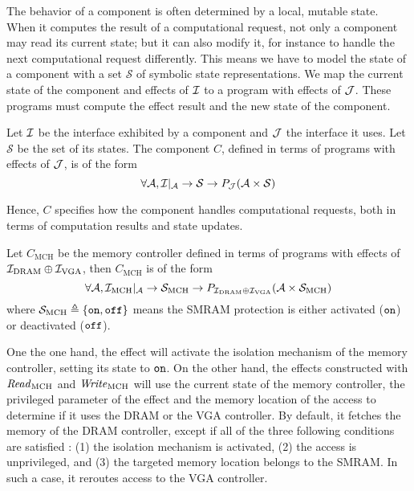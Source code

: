 The behavior of a component is often determined by a local, mutable state.
%
When it computes the result of a computational request, not only a component may
read its current state; but it can also modify it, for instance to handle the
next computational request differently.
%
This means we have to model the state of a component with a set $\mathcal{S}$ of
symbolic state representations.
%
We map the current state of the component and effects of $\mathcal{I}$ to a program with
effects of $\mathcal{J}$.
%
These programs must compute the effect result and the new state of the
component.

\begin{definition}[Component] \label{def:freespec:component-model} Let $\mathcal{I}$ be
  the interface exhibited by a component and $\mathcal{J}$ the interface it uses.
  Let $\mathcal{S}$ be the set of its states.
  The component $C$, defined in terms of programs with effects of $\mathcal{J}$, is of
  the form
  \[ \forall \mathcal{A}, \mathcal{I}|_{\mathcal{A}} \rightarrow \mathcal{S}
    \rightarrow P_{\mathcal{J}}(\mathcal{A} \times \mathcal{S}) \]
\end{definition}

Hence, $C$ specifies how the component handles computational requests, both in
terms of computation results and state updates.

\begin{example}
  \label{ex:mch-specs}

  Let $C_{\mathrm{MCH}}$ be the memory controller defined in terms of programs
  with effects of $\mathcal{I}_{\mathrm{DRAM}} \oplus \mathcal{I}_{\mathrm{VGA}}$, then
  $C_{\mathrm{MCH}}$ is of the form
  \[
    \forall \mathcal{A}, \mathcal{I}_{\mathrm{MCH}}|_{\mathcal{A}} \rightarrow
    \mathcal{S}_{\mathrm{MCH}} \rightarrow P_{\mathcal{I}_{\mathrm{DRAM}} \oplus
      \mathcal{I}_{\mathrm{VGA}}}(\mathcal{A} \times \mathcal{S}_{\mathrm{MCH}})
  \] where $\mathcal{S}_{\mathrm{MCH}} \triangleq \{ \mathtt{on}, \mathtt{off} \}$
  means the SMRAM protection is either activated ($\mathtt{on}$) or deactivated
  ($\mathtt{off}$).

  One the one hand, the  effect will activate the isolation mechanism
  of the memory controller, setting its state to $\mathtt{on}$.
  On the other hand, the effects constructed with $\mathit{Read}_{\mathrm{MCH}}$
  and $\mathit{Write}_{\mathrm{MCH}}$ will use the current state of the memory
  controller, the privileged parameter of the effect and the memory location of the access
   to determine if it uses the DRAM or the VGA controller.
  By default, it fetches the memory of the DRAM controller, except if all of the three following conditions are satisfied : (1) the  isolation mechanism is activated, (2) the access is unprivileged, and (3) the targeted  memory location belongs to the SMRAM.
  In such a case, it reroutes access to the VGA controller.
\end{example}

